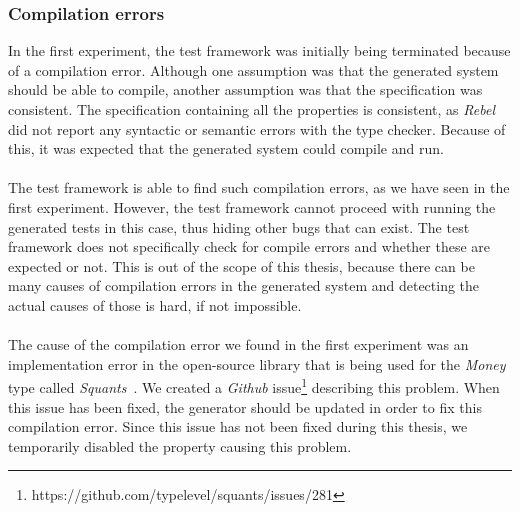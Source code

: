 \subsubsection{Compilation errors}
In the first experiment, the test framework was initially being terminated because of a
compilation error. Although one assumption was that the generated system should
be able to compile, another assumption was that the specification was
consistent. The specification containing all the properties is consistent,
as \textit{Rebel} did not report any syntactic or semantic errors with the type
checker. Because of this, it was expected that the generated system could
compile and run.\\
\\
The test framework is able to find such compilation errors, as we have seen in the first experiment. However, the test framework cannot proceed with running the generated tests in this case, thus hiding other bugs that can exist. The test framework does not specifically check for compile errors and whether these are expected or not. This is out of the scope of this thesis, because there can be many causes of compilation errors in the generated system and detecting the actual causes of those is hard, if not impossible.\\
\\
The cause of the compilation error we found in the first experiment was an implementation error in the open-source library that is being used for the \textit{Money} type called \textit{Squants}~\cite{siteSquants2017}. We
created a \textit{Github} issue\footnote{https://github.com/typelevel/squants/issues/281} describing this problem. When this issue has been fixed, the generator should be updated in order to fix this compilation error. Since this issue has not been fixed during this thesis, we temporarily disabled the property causing this problem.

